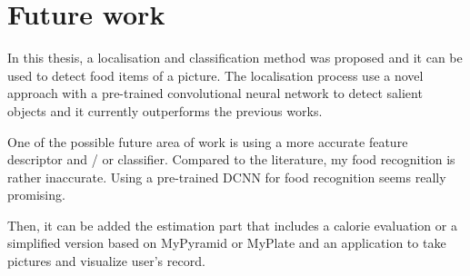 \chapter{Future work} \label{sec:conclusion}

In this thesis, a localisation and classification method was proposed and it can be used to detect food items of a picture. The localisation process use a novel approach with a pre-trained convolutional neural network to detect salient objects and it currently outperforms the previous works.

One of the possible future area of work is using a more accurate feature descriptor and / or classifier. Compared to the literature, my food recognition is rather inaccurate. Using a pre-trained DCNN for food recognition seems really promising.

Then, it can be added the estimation part that includes a calorie evaluation or a simplified version based on MyPyramid or MyPlate and an application to take pictures and visualize user's record.